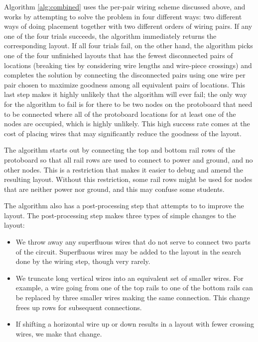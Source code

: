 Algorithm \ref{alg:combined} uses the per-pair wiring scheme discussed above,
and works by attempting to solve the problem in four different ways:
two different ways of doing placement together with two different orders of
wiring pairs. If any one of the four trials
succeeds, the algorithm immediately returns the corresponding layout. If all
four trials fail, on the other hand, the algorithm picks one of the four
unfinished layouts that has
the fewest disconnected pairs of locations (breaking ties by considering
wire lengths and
wire-piece crossings) and completes the solution by connecting the disconnected
pairs using one wire per pair chosen to maximize goodness among
all equivalent pairs of locations.
This last step makes
it highly unlikely that the algorithm will ever fail;
the only way for the algorithm to fail is for there to be two nodes on the
protoboard that need to be
connected where all of the protoboard locations for at least one of the nodes are
occupied, which is highly unlikely. This high success rate comes at the
cost of placing wires that may significantly reduce the goodness of the layout.

The algorithm starts out by connecting the top and bottom rail
rows of the protoboard
so that all rail rows are used to connect to power and ground, and no other
nodes. This is a restriction that makes it easier to debug and amend the
resulting layout. Without this restriction, some rail rows might be used for
nodes that are neither power nor ground, and this may confuse some students.

The algorithm also has a post-processing step that attempts to to improve the
layout. The post-processing step makes three types of simple changes to the
layout:
\begin{itemize}
\item We throw away any superfluous wires that do not serve to connect
two parts of the circuit. Superfluous wires may be added to the layout
in the search done by the wiring step, though very rarely.
\item We truncate
long vertical wires into an equivalent set of smaller wires. For example, a wire
going from one of the top rails to one of the bottom rails can be replaced by
three smaller wires making the same connection. This change frees up rows for
subsequent connections.
\item If shifting a horizontal wire up or down
results in a layout with fewer crossing wires, we make that change.
\end{itemize}

